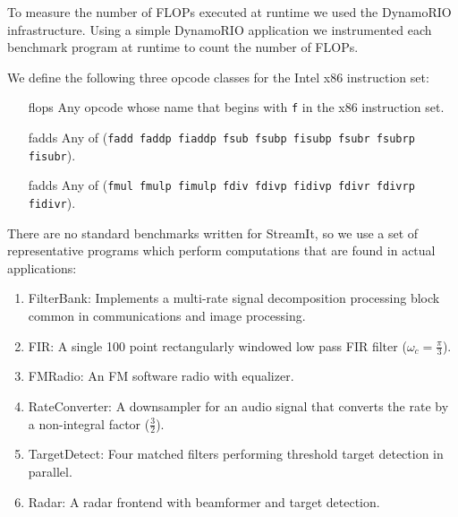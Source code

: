 To measure the number of FLOPs executed at runtime we used the DynamoRIO\cite{rio-webpage, dynamo99}
infrastructure. Using a simple DynamoRIO application 
we instrumented each benchmark program at runtime to count the number of FLOPs.

We define the following three opcode classes for the Intel x86 instruction set:
\begin{itemize}
\item[flops] Any opcode whose name that begins with {\tt f} in the x86 instruction set.
\vspace{-6pt}
\item[fadds] Any of ({\tt fadd faddp fiaddp fsub fsubp fisubp fsubr fsubrp fisubr}).
\vspace{-6pt}
\item[fadds] Any of ({\tt fmul fmulp fimulp fdiv fdivp fidivp fdivr fdivrp fidivr}).
\vspace{-6pt}
\end{itemize}

There are no standard benchmarks written for StreamIt, so we use
a set of representative programs which perform computations that 
are found in actual applications: 

\begin{enumerate}
\item FilterBank: Implements a multi-rate signal decomposition processing block common in communications and image processing.
\vspace{-6pt}

\item FIR: A single 100 point rectangularly windowed low pass FIR filter ($\omega_c=\frac{\pi}{3}$).
\vspace{-6pt}

\item FMRadio: An FM software radio with equalizer.
\vspace{-6pt}

\item RateConverter: A downsampler for an audio signal that converts
the rate by a non-integral factor ($\frac{3}{2}$).
\vspace{-6pt}

\item TargetDetect: Four matched filters performing threshold target
detection in parallel.
\vspace{-6pt}

\item Radar: A radar frontend with beamformer and target detection.
\end{enumerate}

